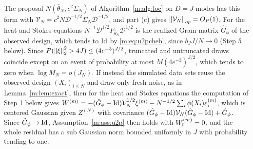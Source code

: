 The proposal $N(\bar\theta_N,c^2\Sigma_N)$ of Algorithm~\ref{m:alg:loc} on $D=J$ modes has this form with $\mathcal V_N=c^2N\mathcal D^{-1/2}\Sigma_N\mathcal D^{-1/2}$, and part (c) gives $\left\|\mathcal V_N\right\|_{op}=O_P(1)$. For the heat and Stokes equations $N^{-1}\mathcal D^{1/2}F_{\bar\theta_N}\mathcal D^{1/2}$ is the realized Gram matrix $\hat G_\phi$ of the observed design, which tends to $\operatorname{Id}$ by \eqref{m:eq:u2pcheb}, since $b_JJ/N\to0$ (Step 5 below). Since $P(\left\|\xi\right\|^2_2>4J)\le(4e^{-3})^{J/2}$, truncated and untruncated draws coincide except on an event of probability at most $M(4e^{-3})^{J/2}$, which tends to zero when $\log M_N=o(J_N)$. If instead the simulated data sets reuse the observed design $(X_i)_{i\le N}$ and draw only fresh noise, as in Lemma~\ref{m:lem:exact}, then for the heat and Stokes equations the computation of Step 1 below gives $W^{(m)}=-(\hat G_\phi-\operatorname{Id})\mathcal V_N^{1/2}\xi^{(m)}-N^{-1/2}\sum_i\phi(X_i)\varepsilon^{(m)}_i$, which is centered Gaussian given $Z^{(N)}$ with covariance $(\hat G_\phi-\operatorname{Id})\mathcal V_N(\hat G_\phi-\operatorname{Id})+\hat G_\phi$. Since $\hat G_\phi\to\operatorname{Id}$, Assumption~\ref{m:ass:u2p} then holds with $W^{(m)}_{\rm r}=0$, and the whole residual has a sub Gaussian norm bounded uniformly in $J$ with probability tending to one.

